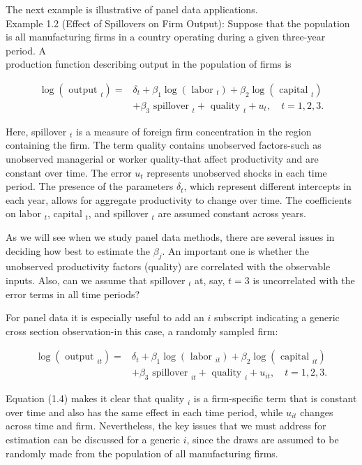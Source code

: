 \documentclass[10pt]{article}
\begin{document}
The next example is illustrative of panel data applications.\\
Example 1.2 (Effect of Spillovers on Firm Output): Suppose that the population is all manufacturing firms in a country operating during a given three-year period. A\\
production function describing output in the population of firms is


\begin{align*}
\log \left(\text { output }_{t}\right)= & \delta_{t}+\beta_{1} \log \left(\text { labor }_{t}\right)+\beta_{2} \log \left(\text { capital }_{t}\right) \\
& +\beta_{3} \text { spillover }_{t}+\text { quality }_{t}+u_{t}, \quad t=1,2,3 . \tag{1.3}
\end{align*}


Here, spillover $_{t}$ is a measure of foreign firm concentration in the region containing the firm. The term quality contains unobserved factors-such as unobserved managerial or worker quality-that affect productivity and are constant over time. The error $u_{t}$ represents unobserved shocks in each time period. The presence of the parameters $\delta_{t}$, which represent different intercepts in each year, allows for aggregate productivity to change over time. The coefficients on labor $_{t}$, capital $_{t}$, and spillover $_{t}$ are assumed constant across years.

As we will see when we study panel data methods, there are several issues in deciding how best to estimate the $\beta_{j}$. An important one is whether the unobserved productivity factors (quality) are correlated with the observable inputs. Also, can we assume that spillover $_{t}$ at, say, $t=3$ is uncorrelated with the error terms in all time periods?

For panel data it is especially useful to add an $i$ subscript indicating a generic cross section observation-in this case, a randomly sampled firm:


\begin{align*}
\log \left(\text { output }_{i t}\right)= & \delta_{t}+\beta_{1} \log \left(\text { labor }_{i t}\right)+\beta_{2} \log \left(\text { capital }_{i t}\right) \\
& +\beta_{3} \text { spillover }_{i t}+\text { quality }_{i}+u_{i t}, \quad t=1,2,3 . \tag{1.4}
\end{align*}


Equation (1.4) makes it clear that quality ${ }_{i}$ is a firm-specific term that is constant over time and also has the same effect in each time period, while $u_{i t}$ changes across time and firm. Nevertheless, the key issues that we must address for estimation can be discussed for a generic $i$, since the draws are assumed to be randomly made from the population of all manufacturing firms.
\end{document}
